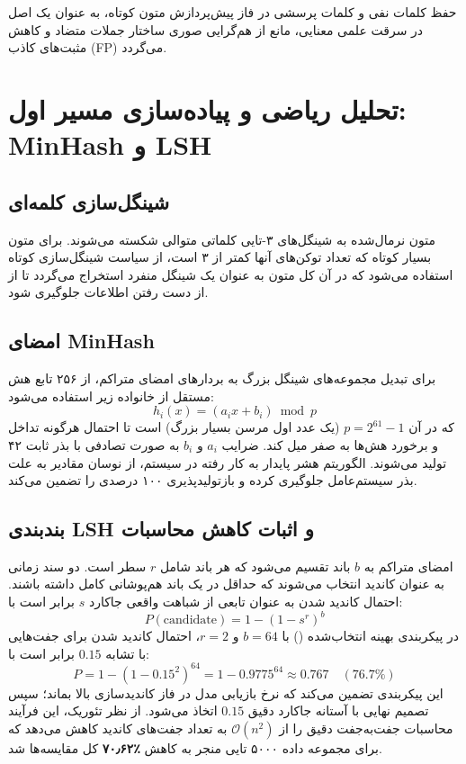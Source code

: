 \documentclass[12pt,onecolumn,a4paper]{article}
\begin{document}
\begin{axiombox}
حفظ کلمات نفی و کلمات پرسشی در فاز پیش‌پردازش متون کوتاه، به عنوان یک اصل در سرقت علمی معنایی، مانع از هم‌گرایی صوری ساختار جملات متضاد و کاهش مثبت‌های کاذب (FP) می‌گردد.
\end{axiombox}

\section{تحلیل ریاضی و پیاده‌سازی مسیر اول: MinHash و LSH}

\subsection{شینگل‌سازی کلمه‌ای}
متون نرمال‌شده به شینگل‌های ۳-تایی کلماتی متوالی شکسته می‌شوند. برای متون بسیار کوتاه که تعداد توکن‌های آنها کمتر از ۳ است، از سیاست شینگل‌سازی کوتاه استفاده می‌شود که در آن کل متون به عنوان یک شینگل منفرد استخراج می‌گردد تا از از دست رفتن اطلاعات جلوگیری شود.

\subsection{امضای MinHash}
برای تبدیل مجموعه‌های شینگل بزرگ به بردارهای امضای متراکم، از ۲۵۶ تابع هش مستقل از خانواده زیر استفاده می‌شود:
\[
h_i(x) = (a_i x + b_i) \bmod p
\]
که در آن $p = 2^{61}-1$ (یک عدد اول مرسن بسیار بزرگ) است تا احتمال هرگونه تداخل و برخورد هش‌ها به صفر میل کند. ضرایب $a_i$ و $b_i$ به صورت تصادفی با بذر ثابت ۴۲ تولید می‌شوند. الگوریتم هشر پایدار  به کار رفته در سیستم، از نوسان مقادیر به علت بذر سیستم‌عامل جلوگیری کرده و بازتولیدپذیری ۱۰۰ درصدی را تضمین می‌کند.

\subsection{بندبندی LSH و اثبات کاهش محاسبات}
امضای متراکم به $b$ باند تقسیم می‌شود که هر باند شامل $r$ سطر است. دو سند زمانی به عنوان کاندید انتخاب می‌شوند که حداقل در یک باند هم‌پوشانی کامل داشته باشند. احتمال کاندید شدن به عنوان تابعی از شباهت واقعی جاکارد $s$ برابر است با:
\[
P(\text{candidate}) = 1 - (1 - s^r)^b
\]
در پیکربندی بهینه انتخاب‌شده () با $b=64$ و $r=2$، احتمال کاندید شدن برای جفت‌هایی با تشابه $0.15$ برابر است با:
\[
P = 1 - (1 - 0.15^2)^{64} = 1 - 0.9775^{64} \approx 0.767\quad (76.7\%)
\]
این پیکربندی تضمین می‌کند که نرخ بازیابی مدل در فاز کاندیدسازی بالا بماند؛ سپس تصمیم نهایی با آستانه جاکارد دقیق $0.15$ اتخاذ می‌شود. از نظر تئوریک، این فرآیند محاسبات جفت‌به‌جفت دقیق را از $\mathcal{O}(n^2)$ به تعداد جفت‌های کاندید کاهش می‌دهد که برای مجموعه داده ۵۰۰۰ تایی منجر به کاهش \textbf{٪۷۰٫۶۲} کل مقایسه‌ها شد.
\end{document}
